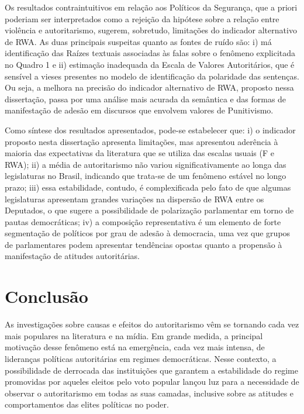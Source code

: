 \documentclass[
12pt,				%
openright,			%
twoside,			%
a4paper,			%
english,			%
french,				%
spanish,			%
brazil				%
]{abntex2}
\begin{document}
Os resultados contraintuitivos em relação aos Políticos da Segurança, que a priori poderiam ser interpretados como a rejeição da hipótese sobre a relação entre violência e autoritarismo, sugerem, sobretudo, limitações do indicador alternativo de RWA. As duas principais suspeitas quanto as fontes de ruído são: i) má identificação das Raízes textuais associadas às falas sobre o fenômeno explicitada no Quadro 1 e ii) estimação inadequada da Escala de Valores Autoritários, que é sensível a vieses presentes no modelo de identificação da polaridade das sentenças. Ou seja, a melhora na precisão do indicador alternativo de RWA, proposto nessa dissertação, passa por uma análise mais acurada da semântica e das formas de manifestação de adesão em discursos que envolvem valores de Punitivismo. 

Como síntese dos resultados apresentados, pode-se estabelecer que: i) o indicador proposto nesta dissertação apresenta limitações, mas apresentou aderência à maioria das expectativas da literatura que se utiliza das escalas usuais (F e RWA); ii) a média de autoritarismo não variou significativamente ao longa das legislaturas no Brasil, indicando que trata-se de um fenômeno estável no longo prazo; iii) essa estabilidade, contudo, é complexificada pelo fato de que algumas legislaturas apresentam grandes variações na dispersão de RWA entre os Deputados, o que sugere a possibilidade de polarização parlamentar em torno de pautas democráticas; iv) a composição representativa é um elemento de forte segmentação de políticos por grau de adesão à democracia, uma vez que grupos de parlamentares podem apresentar tendências opostas quanto a propensão à manifestação de atitudes autoritárias. 

\chapter{Conclusão}

As investigações sobre causas e efeitos do autoritarismo vêm se tornando cada vez mais populares na literatura e na mídia. Em grande medida, a principal motivação desse fenômeno está na emergência, cada vez mais intensa, de lideranças políticas autoritárias em regimes democráticas. Nesse contexto, a possibilidade de derrocada das instituições que garantem a estabilidade do regime promovidas por aqueles eleitos pelo voto popular lançou luz para a necessidade de observar o autoritarismo em todas as suas camadas, inclusive sobre as atitudes e comportamentos das elites políticas no poder. 
\end{document}

